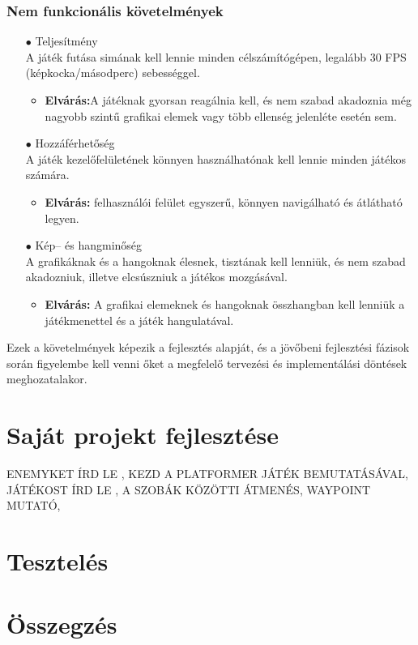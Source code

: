 \documentclass[
]{thesis-ekf}
\theoremstyle{definition}
\theoremstyle{remark}
\begin{document}
\subsection{Nem funkcionális követelmények}
\begin{itemize}
	\item[$\bullet$] Teljesítmény \\ A játék futása simának kell lennie minden célszámítógépen, legalább 30 FPS (képkocka/másodperc) sebességgel.
	\begin{itemize}
		\item \textbf{Elvárás:}A játéknak gyorsan reagálnia kell, és nem szabad akadoznia még nagyobb szintű grafikai elemek vagy több ellenség jelenléte esetén sem.
	\end{itemize}
	\item[$\bullet$] Hozzáférhetőség\\ A játék kezelőfelületének könnyen használhatónak kell lennie minden játékos számára.
	\begin{itemize}
		\item \textbf{Elvárás:} felhasználói felület egyszerű, könnyen navigálható és átlátható legyen.
	\end{itemize}
	\item[$\bullet$] Kép-- és hangminőség\\A grafikáknak és a hangoknak élesnek, tisztának kell lenniük, és nem szabad akadozniuk, illetve elcsúszniuk a játékos mozgásával.
	\begin{itemize}
		\item \textbf{Elvárás:} A grafikai elemeknek és hangoknak összhangban kell lenniük a játékmenettel és a játék hangulatával.
	\end{itemize}
\end{itemize}
Ezek a követelmények képezik a fejlesztés alapját, és a jövőbeni fejlesztési fázisok során figyelembe kell venni őket a megfelelő tervezési és implementálási döntések meghozatalakor.
\chapter{Saját projekt fejlesztése}
ENEMYKET ÍRD LE , KEZD A PLATFORMER JÁTÉK BEMUTATÁSÁVAL, JÁTÉKOST ÍRD LE , A SZOBÁK KÖZÖTTI ÁTMENÉS, WAYPOINT MUTATÓ,
\chapter{Tesztelés}

\chapter*{Összegzés}
\end{document}
